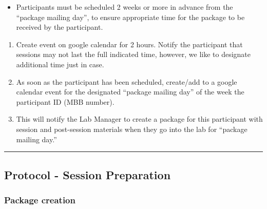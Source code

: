 \documentclass[]{book}
\providecommand{\tightlist}{%
  \setlength{\itemsep}{0pt}\setlength{\parskip}{0pt}}
\begin{document}
\begin{itemize}
\tightlist
\item
  Participants must be scheduled 2 weeks or more in advance from the ``package mailing day'', to ensure appropriate time for the package to be received by the participant.
\end{itemize}

\begin{enumerate}
\def\labelenumi{\arabic{enumi}.}
\setcounter{enumi}{2}
\tightlist
\item
  Create event on google calendar for 2 hours. Notify the participant that sessions may not last the full indicated time, however, we like to designate additional time just in case.
\item
  As soon as the participant has been scheduled, create/add to a google calendar event for the designated ``package mailing day'' of the week the participant ID (MBB number).
\item
  This will notify the Lab Manager to create a package for this participant with session and post-session materials when they go into the lab for ``package mailing day.''
\end{enumerate}

\begin{center}\rule{0.5\linewidth}{0.5pt}\end{center}

\hypertarget{protocol---session-preparation-1}{%
\subsection{Protocol - Session Preparation}\label{protocol---session-preparation-1}}

\hypertarget{package-creation-1}{%
\subsubsection{Package creation}\label{package-creation-1}}
\end{document}
